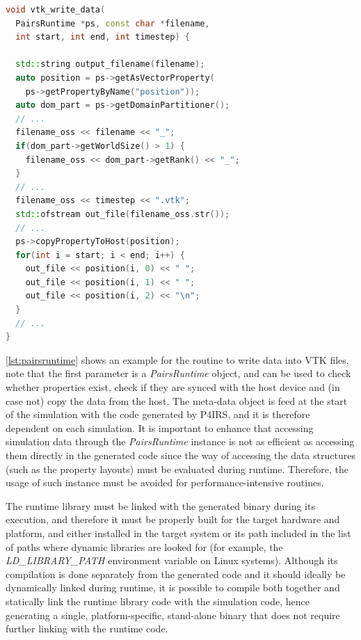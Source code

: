 \documentclass[Afour,sageh,times]{sagej}
\newcommand{\RMchange}[1]{{\color{blue} #1}}
\begin{document}
\begin{lstlisting}[language=C++,
		   label={lst:pairsruntime},
	   	   caption={P4IRS runtime routine example for writing VTK data into a file.}]
void vtk_write_data(
  PairsRuntime *ps, const char *filename,
  int start, int end, int timestep) {

  std::string output_filename(filename);
  auto position = ps->getAsVectorProperty(
    ps->getPropertyByName("position"));
  auto dom_part = ps->getDomainPartitioner();
  // ...
  filename_oss << filename << "_";
  if(dom_part->getWorldSize() > 1) {
    filename_oss << dom_part->getRank() << "_";
  }
  // ...
  filename_oss << timestep << ".vtk";
  std::ofstream out_file(filename_oss.str());
  // ...
  ps->copyPropertyToHost(position);
  for(int i = start; i < end; i++) {
    out_file << position(i, 0) << " ";
    out_file << position(i, 1) << " ";
    out_file << position(i, 2) << "\n";
  }
  // ...
}
\end{lstlisting}

\autoref{lst:pairsruntime} shows an example for the routine to write data into VTK files, note that the first parameter is a \emph{PairsRuntime} object, and can be used to check whether properties exist, check if they are synced with the host device and (in case not) copy the data from the host.
The meta-data object is feed at the start of the simulation with the code generated by P4IRS, and it is therefore dependent on each simulation.
It is important to enhance that accessing simulation data through the \emph{PairsRuntime} instance is not as efficient as accessing them directly in the generated code since the way of accessing the data structures (such as the property layouts) must be evaluated during runtime.
Therefore, the usage of such instance must be avoided for performance-intensive routines.

\RMchange{The runtime library must be linked with the generated binary during its execution, and therefore it must be properly built for the target hardware and platform, and either installed in the target system or its path included in the list of paths where dynamic libraries are looked for (for example, the \emph{LD\_LIBRARY\_PATH} environment variable on Linux systems).
Although its compilation is done separately from the generated code and it should ideally be dynamically linked during runtime, it is possible to compile both together and statically link the runtime library code with the simulation code, hence generating a single, platform-specific, stand-alone binary that does not require further linking with the runtime code.}
\end{document}
